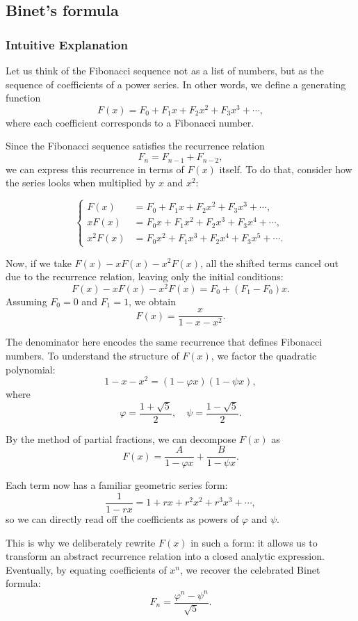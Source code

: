 \documentclass{article}
\begin{document}
\subsection{Binet's formula}
\subsubsection{Intuitive Explanation}

Let us think of the Fibonacci sequence not as a list of numbers, but as the sequence of coefficients of a power series.  
In other words, we define a generating function
\[
F(x) = F_0 + F_1x + F_2x^2 + F_3x^3 + \cdots,
\]
where each coefficient corresponds to a Fibonacci number.  

Since the Fibonacci sequence satisfies the recurrence relation
\[
F_n = F_{n-1} + F_{n-2},
\]
we can express this recurrence in terms of $F(x)$ itself.  
To do that, consider how the series looks when multiplied by $x$ and $x^2$:

\[
\left\{
\begin{aligned}
	F(x) &= F_0 + F_1x + F_2x^2 + F_3x^3 + \cdots, \\
	xF(x) &= F_0x + F_1x^2 + F_2x^3 + F_3x^4 + \cdots, \\
	x^2F(x) &= F_0x^2 + F_1x^3 + F_2x^4 + F_3x^5 + \cdots.
\end{aligned}
\right.
\]

Now, if we take $F(x) - xF(x) - x^2F(x)$, all the shifted terms cancel out due to the recurrence relation, leaving only the initial conditions:
\[
F(x) - xF(x) - x^2F(x) = F_0 + (F_1 - F_0)x.
\]
Assuming $F_0 = 0$ and $F_1 = 1$, we obtain
\[
F(x) = \frac{x}{1 - x - x^2}.
\]

The denominator here encodes the same recurrence that defines Fibonacci numbers.  
To understand the structure of $F(x)$, we factor the quadratic polynomial:
\[
1 - x - x^2 = (1 - \varphi x)(1 - \psi x),
\]
where 
\[
\varphi = \frac{1 + \sqrt{5}}{2}, \quad \psi = \frac{1 - \sqrt{5}}{2}.
\]

By the method of partial fractions, we can decompose $F(x)$ as
\[
F(x) = \frac{A}{1 - \varphi x} + \frac{B}{1 - \psi x}.
\]

Each term now has a familiar geometric series form:
\[
\frac{1}{1 - r x} = 1 + r x + r^2x^2 + r^3x^3 + \cdots,
\]
so we can directly read off the coefficients as powers of $\varphi$ and $\psi$.  

This is why we deliberately rewrite $F(x)$ in such a form:  
it allows us to transform an abstract recurrence relation into a closed analytic expression.  
Eventually, by equating coefficients of $x^n$, we recover the celebrated Binet formula:
\[
F_n = \frac{\varphi^n - \psi^n}{\sqrt{5}}.
\]
\end{document}
